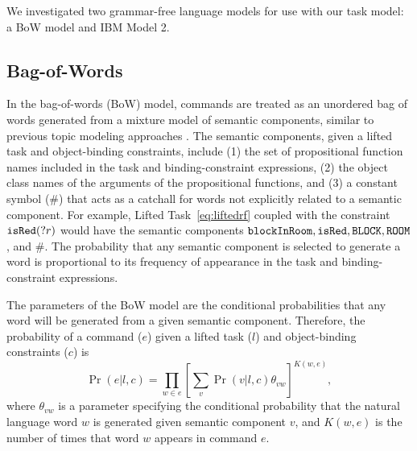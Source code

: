 \documentclass[conference]{IEEEtran}
\begin{document}
We investigated two grammar-free language models for use with our task model: a BoW model and IBM Model 2.

\subsection{Bag-of-Words}
In the bag-of-words (BoW) model, commands are treated as an unordered bag of words generated from a mixture model of semantic components, similar to previous topic modeling approaches \cite{McCallum:1999vn}. The semantic components, given a lifted task and object-binding constraints, include (1) the set of propositional function names included in the task and binding-constraint expressions, (2) the object class names of the arguments of the propositional functions, and (3) a constant symbol ($\#$) that acts as a catchall for words not explicitly related to a semantic component. For example, Lifted Task~\ref{eq:liftedrf} coupled with the constraint ${\tt isRed}(?r)$ would have the semantic components ${\tt blockInRoom}, {\tt isRed}, {\tt BLOCK}, {\tt ROOM}$, and $\#$. The probability that any semantic component is selected to generate a word is proportional to its frequency of appearance in the task and binding-constraint expressions.

The parameters of the BoW model are the conditional probabilities that any word will be generated from a given semantic component. Therefore, the probability of a command ($e$) given a lifted task ($l$) and object-binding constraints ($c$) is
\begin{equation}
\Pr(e | l, c)  = \prod_{w \in e} \left[ \sum_v \Pr(v | l, c) \theta_{vw} \right]^{K(w, e)},
\end{equation}
where $\theta_{vw}$ is a parameter specifying the conditional probability that the natural language word $w$ is generated given semantic component $v$, and $K(w, e)$ is the number of times that word $w$ appears in command $e$.


\end{document}
